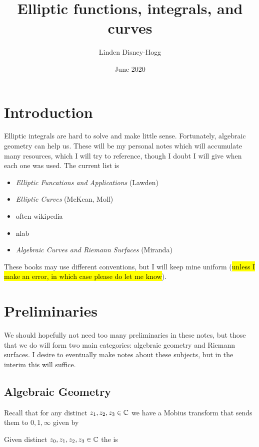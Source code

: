 \documentclass{article}
\title{Elliptic functions, integrals, and curves}
\author{Linden Disney-Hogg}
\date{June 2020}
\begin{document}
\maketitle
\tableofcontents

\section{Introduction}
Elliptic integrals are hard to solve and make little sense. Fortunately, algebraic geometry can help us. These will be my personal notes which will accumulate many resources, which I will try to reference, though I doubt I will give when each one was used. The current list is 
\begin{itemize}
	\item \textit{Elliptic Funcations and Applications} (Lawden)
	\item \textit{Elliptic Curves} (McKean, Moll) 
	\item often wikipedia
	\item nlab
	\item \textit{Algebraic Curves and Riemann Surfaces} (Miranda)
\end{itemize}
These books may use different conventions, but I will keep mine uniform (\hl{unless I make an error, in which case please do let me know}). 

\section{Preliminaries}
We should hopefully not need too many preliminaries in these notes, but those that we do will form two main categories: algebraic geometry and Riemann surfaces. I desire to eventually make notes about these subjects, but in the interim this will suffice. 

\subsection{Algebraic Geometry}

Recall that for any distinct $z_1, z_2, z_3 \in \mathbb{C}$ we have a Mobius transform that sends them to $0,1,\infty$ given by 
\begin{definition}
Given distinct $z_0, z_1, z_2, z_3 \in \mathbb{C}$ the  is 
\end{definition}
\end{document}
